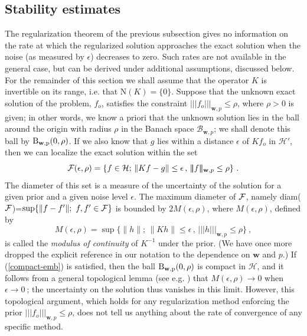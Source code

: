 \documentclass[10pt]{article}
\def\cB{\mathcal{B}}
\def\cH{\mathcal{H}}
\def\mN{\mbox{N}}
\newcommand\eref[1]{(\ref{#1})}
\def\Vvert{\vert\!\vert\!\vert}
\begin{document}
\subsection{Stability estimates}

The regularization theorem of the previous subsection
gives no information on the rate at
which the regularized solution approaches the exact solution when the noise
(as measured by $\epsilon$) decreases to
zero. Such rates are not available in the general case, but can be derived
under additional assumptions, discussed below.
For the remainder of this section we shall assume
that the operator $K$ is invertible on its range, i.e. that
$\mN(K)=\{0\}$. Suppose that the
unknown exact solution of the problem, $f_o$, satisfies the constraint
$\Vvert f_o \Vvert_{\mathbf{w},p} \leq \rho$, where $\rho>0$ is given; in
other words, we know a priori
that the unknown solution lies in the ball around the origin with radius $\rho$
in the Banach space $\cB_{\mathbf{w},p}$; we shall denote this ball
by $\rm{B}_{\mathbf{w},p}(0,\rho)$. If we also know that $g$ lies within
a distance $\epsilon$ of $Kf_o$ in $\cH'$, then
we can localize the exact
solution within the set
\begin{equation*}
{\cal F}(\epsilon,\rho) =
\{ f\in \cH ; \, \| Kf-g \| \leq \epsilon\, ,
\, \Vvert f\Vvert_{\mathbf{w},p} \leq \rho \}\ .
\end{equation*}
The diameter of this set is a measure of the uncertainty of the
solution for a given prior and a given noise level $\epsilon$. The maximum
diameter of ${\cal F}$, namely diam(${\cal F}$)=$\sup\{ \| f-f'\|;\
f,f' \in {\cal F}\}$ is bounded by $2M(\epsilon,\rho)$, where
$M(\epsilon,\rho)$, defined by
\begin{equation}
M(\epsilon,\rho)=\sup\{\| h\|;\, \| Kh \|
\leq \epsilon \, ,\, \Vvert h\Vvert_{\mathbf{w},p} \leq \rho\} \ ,
\label{MC}
\end{equation}
is called the {\it modulus of continuity} of $K^{-1}$ under the
prior. (We have once more dropped the explicit reference in our
notation to the dependence on $\mathbf{w}$ and $p$.)
If \eref{compact-emb} is satisfied, then
the ball $\rm{B}_{\mathbf{w},p}(0,\rho)$ is compact in $\cH$, and it
follows from a general topological lemma
(see e.g. \cite{Eng96}) that $M(\epsilon,\rho) \to 0$
when $\epsilon \to 0~$; the uncertainty on the solution
thus vanishes in this limit. However,
this topological argument, which holds for any regularization
method enforcing the prior $\Vvert f_o \Vvert_{\mathbf{w},p} \leq \rho$,
does not tell us anything about the rate of convergence
of any specific method.
\end{document}

